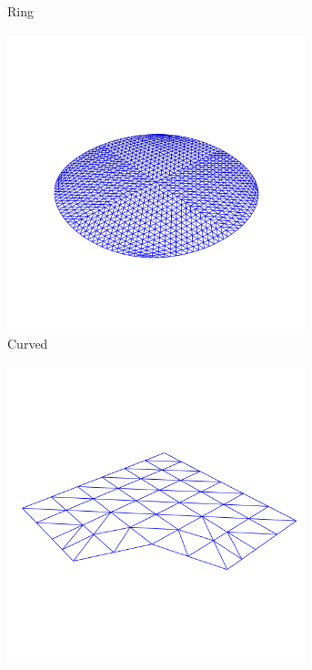 \documentclass[crop=false,10pt,ngerman]{standalone}
\begin{document}
\begin{figure}[h]
\begin{subfigure}[b]{0.24\textwidth}
          \caption{Ring}
        \end{subfigure}
        \begin{subfigure}[b]{0.24\textwidth}
          \center
          \includegraphics[trim={0 0 0 2cm},clip,width=0.95\textwidth]{images/model-circle-1.png}
          \caption{Curved}
        \end{subfigure}
        \begin{subfigure}[b]{0.24\textwidth}
          \center
          \includegraphics[trim={0 0 0 2cm},clip,width=0.95\textwidth]{images/model-test-1.png}

\end{subfigure}
\end{figure}
\end{document}

